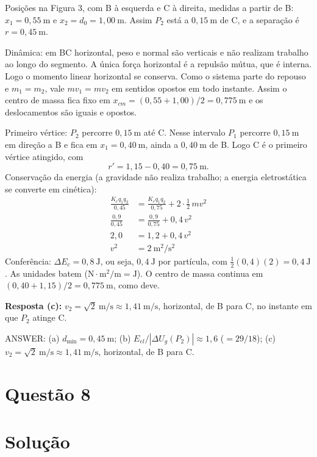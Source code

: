 \documentclass{article}%
\begin{document}
Posições na Figura 3, com B à esquerda e C à direita, medidas a partir de B: $x_1 = 0{,}55\ \mathrm{m}$ e $x_2 = d_0 = 1{,}00\ \mathrm{m}$. Assim $P_2$ está a $0{,}15\ \mathrm{m}$ de C, e a separação é $r = 0{,}45\ \mathrm{m}$.

Dinâmica: em BC horizontal, peso e normal são verticais e não realizam trabalho ao longo do segmento. A única força horizontal é a repulsão mútua, que é interna. Logo o momento linear horizontal se conserva. Como o sistema parte do repouso e $m_1 = m_2$, vale $mv_1 = mv_2$ em sentidos opostos em todo instante. Assim o centro de massa fica fixo em $x_{cm} = (0{,}55+1{,}00)/2 = 0{,}775\ \mathrm{m}$ e os deslocamentos são iguais e opostos.

Primeiro vértice: $P_2$ percorre $0{,}15\ \mathrm{m}$ até C. Nesse intervalo $P_1$ percorre $0{,}15\ \mathrm{m}$ em direção a B e fica em $x_1 = 0{,}40\ \mathrm{m}$, ainda a $0{,}40\ \mathrm{m}$ de B. Logo C é o primeiro vértice atingido, com
\[
r' = 1{,}15 - 0{,}40 = 0{,}75\ \mathrm{m}.
\]
Conservação da energia (a gravidade não realiza trabalho; a energia eletrostática se converte em cinética):
\begin{align*}
\frac{K_e q_1 q_2}{0{,}45} &= \frac{K_e q_1 q_2}{0{,}75} + 2\cdot\frac{1}{2}\,m v^2 \\
\frac{0{,}9}{0{,}45} &= \frac{0{,}9}{0{,}75} + 0{,}4\,v^2 \\
2{,}0 &= 1{,}2 + 0{,}4\,v^2 \\
v^2 &= 2\ \mathrm{m^2/s^2}
\end{align*}
Conferência: $\Delta E_c = 0{,}8\ \mathrm{J}$, ou seja, $0{,}4\ \mathrm{J}$ por partícula, com $\tfrac{1}{2}(0{,}4)(2) = 0{,}4\ \mathrm{J}$. As unidades batem ($\mathrm{N\cdot m^2}/\mathrm{m} = \mathrm{J}$). O centro de massa continua em $(0{,}40+1{,}15)/2 = 0{,}775\ \mathrm{m}$, como deve.

\textbf{Resposta (c):} $v_2 = \sqrt{2}\ \mathrm{m/s}\approx 1{,}41\ \mathrm{m/s}$, horizontal, de B para C, no instante em que $P_2$ atinge C.

ANSWER: (a) $d_{\min} = 0{,}45\ \mathrm{m}$; (b) $E_{el}/|\Delta U_g(P_2)|\approx 1{,}6$ ($=29/18$); (c) $v_2 = \sqrt{2}\ \mathrm{m/s}\approx 1{,}41\ \mathrm{m/s}$, horizontal, de B para C.%
\newpage%
\section*{Questão 8}

\section*{Solução}
\end{document}

